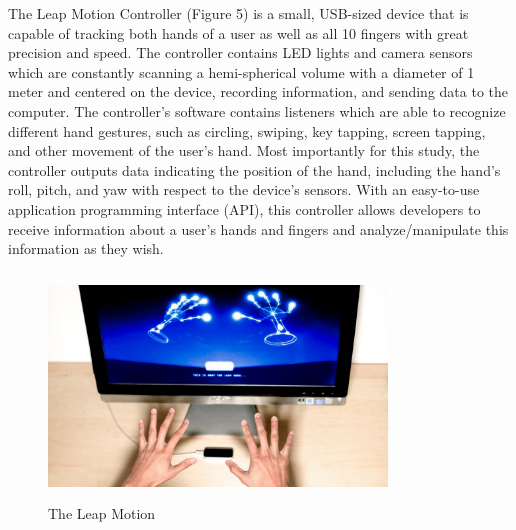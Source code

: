 \documentclass[letterpaper,english, 12pt]{article}
\begin{document}
The Leap Motion Controller (Figure 5) is a small, USB-sized device that is capable of tracking both hands of a user as well as all 10 fingers with great precision and speed. The controller contains LED lights and camera sensors which are constantly scanning a hemi-spherical volume with a diameter of 1 meter  and centered on the device, recording information, and sending data to the computer. The controller's software contains listeners which are able to recognize different hand gestures, such as circling, swiping, key tapping, screen tapping, and other movement of the user's hand. Most importantly for this study, the controller outputs data indicating the position of the hand, including the hand's roll, pitch, and yaw with respect to the device's sensors. With an easy-to-use application programming interface (API), this controller allows developers to receive information about a user's hands and fingers and analyze/manipulate this information as they wish.

\begin{figure}[H]
	\centering
	\includegraphics[height=6cm,width=90mm]{pics/leap.jpg}
	\caption{The Leap Motion}
\end{figure}
\end{document}
